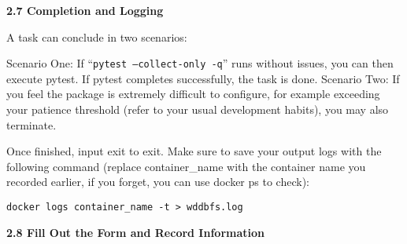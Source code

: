 \textbf{2.7 Completion and Logging}

A task can conclude in two scenarios:

Scenario One: If ``\texttt{pytest --collect-only -q}'' runs without issues, you can then execute pytest. If pytest completes successfully, the task is done.
Scenario Two: If you feel the package is extremely difficult to configure, for example exceeding your patience threshold (refer to your usual development habits), you may also terminate.

Once finished, input exit to exit. Make sure to save your output logs with the following command (replace {container\_name} with the container name you recorded earlier, if you forget, you can use docker ps to check):

\texttt{docker logs {container\_name} -t > wddbfs.log}

\textbf{2.8 Fill Out the Form and Record Information}

